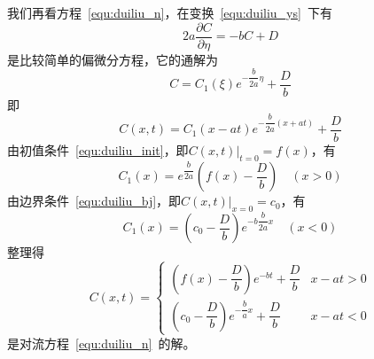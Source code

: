 我们再看方程~\ref{equ:duiliu_n}，在变换~\ref{equ:duiliu_ys}~下有
\begin{equation}
2a\dfrac{\partial C}{\partial \eta} = -bC+D
\end{equation}
是比较简单的偏微分方程，它的通解为
\begin{equation}
C=C_1(\xi)e^{-\dfrac{b}{2a}\eta}+\dfrac{D}{b}
\end{equation}
即
\begin{equation}
C(x,t)=C_1(x-at)e^{-\dfrac{b}{2a}(x+at)}+\dfrac{D}{b}
\end{equation}
由初值条件~\ref{equ:duiliu_init}，即$\left.C(x,t)\right|_{t=0}=f(x)$，有
\begin{equation}
C_1(x)=e^{\dfrac{b}{2a}}\left(f(x)-\dfrac{D}{b}\right)\quad(x>0)
\end{equation}
由边界条件~\ref{equ:duiliu_bj}，即$\left.C(x,t)\right|_{x=0}=c_0$，有
\begin{equation}
C_1(x)=\left(c_0-\dfrac{D}{b}\right)e^{-b\dfrac{b}{2a}x}\quad(x<0)
\end{equation}
整理得
\begin{equation}
C(x,t)=
\begin{cases}
\left(f(x)-\dfrac{D}{b}\right)e^{-bt}+\dfrac{D}{b}  & x-at>0 \\
\left(c_0-\dfrac{D}{b}\right)e^{-\dfrac{b}{a}x}+\dfrac{D}{b}	&x-at<0
\end{cases}
\end{equation}
是对流方程~\ref{equ:duiliu_n}~的解。
